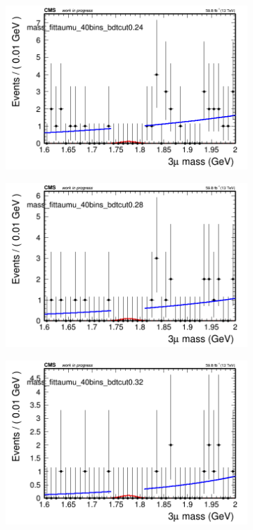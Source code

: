 \begin{figure}[H]
\begin{subfigure}{0.2\textwidth}
        \includegraphics[width=\textwidth]{unfixed_exp/plots/taumu/massfit_taumu_40bins_bdtcut0.24.png}
        \caption{}
    \end{subfigure}
    \begin{subfigure}{0.2\textwidth}
        \includegraphics[width=\textwidth]{unfixed_exp/plots/taumu/massfit_taumu_40bins_bdtcut0.28.png}
        \caption{}
    \end{subfigure}
    \begin{subfigure}{0.2\textwidth}
        \includegraphics[width=\textwidth]{unfixed_exp/plots/taumu/massfit_taumu_40bins_bdtcut0.32.png}

\end{subfigure}
\end{figure}

